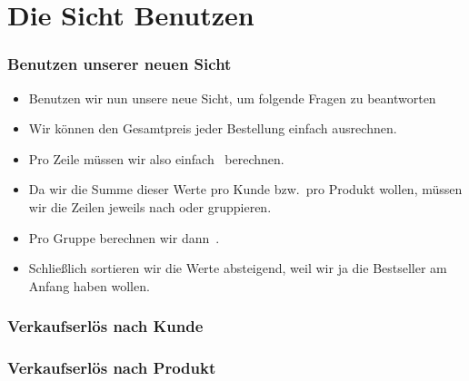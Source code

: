 \documentclass[aspectratio=169,mathserif,notheorems]{beamer}%
\begin{document}
\section{Die Sicht Benutzen}%
%
\begin{frame}%
\frametitle{Benutzen unserer neuen Sicht}%
\begin{itemize}%
\item Benutzen wir nun unsere neue Sicht, um folgende Fragen zu beantworten%
\item<4-> Wir können den Gesamtpreis jeder Bestellung einfach ausrechnen.%
\item<6-> Pro Zeile müssen wir also einfach~ berechnen.%
\item<7-> Da wir die Summe dieser Werte pro Kunde bzw.\ pro Produkt wollen, müssen wir die Zeilen jeweils nach  oder  gruppieren.%
\item<8-> Pro Gruppe berechnen wir dann~\cite{PGDG:PD:AF}.%
\item<9-> Schließlich sortieren wir die Werte absteigend, weil wir ja die Bestseller am Anfang haben wollen.%
\end{itemize}%
\end{frame}%
%
\begin{frame}[t]
\frametitle{Verkaufserlös nach Kunde}%
%
\end{frame}
%
\begin{frame}[t]
\frametitle{Verkaufserlös nach Produkt}%
%
\end{frame}
%
\end{document}
